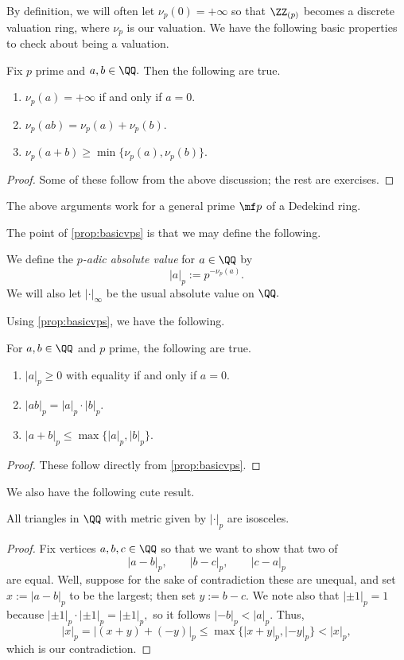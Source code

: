 \documentclass[../notes.tex]{subfiles}
\begin{document}
By definition, we will often let $\nu_p(0)=+\infty$ so that $\ZZ_{(p)}$ becomes a discrete valuation ring, where $\nu_p$ is our valuation. We have the following basic properties to check about being a valuation.
\begin{proposition} \label{prop:basicvps}
	Fix $p$ prime and $a,b\in\QQ.$ Then the following are true.
	\begin{enumerate}[label=(\alph*)]
		\item $\nu_p(a)=+\infty$ if and only if $a=0.$
		\item $\nu_p(ab)=\nu_p(a)+\nu_p(b).$
		\item $\nu_p(a+b)\ge\min\{\nu_p(a),\nu_p(b)\}.$
	\end{enumerate}
\end{proposition}
\begin{proof}
	Some of these follow from the above discussion; the rest are exercises.\todo{}
\end{proof}
\begin{remark}
	The above arguments work for a general prime $\mf p$ of a Dedekind ring.
\end{remark}
The point of \autoref{prop:basicvps} is that we may define the following.
\begin{defi}
	We define the \textit{$p$-adic absolute value} for $a\in\QQ$ by
	\[|a|_p:=p^{-\nu_p(a)}.\]
	We will also let $|\cdot|_\infty$ be the usual absolute value on $\QQ.$
\end{defi}
Using \autoref{prop:basicvps}, we have the following.
\begin{corollary}
	For $a,b\in\QQ$ and $p$ prime, the following are true.
	\begin{enumerate}[label=(\alph*)]
		\item $|a|_p\ge0$ with equality if and only if $a=0.$
		\item $|ab|_p=|a|_p\cdot|b|_p.$
		\item $|a+b|_p\le\max\{|a|_p,|b|_p\}.$
	\end{enumerate}
\end{corollary}
\begin{proof}
	These follow directly from \autoref{prop:basicvps}.
\end{proof}
We also have the following cute result.
\begin{proposition}
	All triangles in $\QQ$ with metric given by $|\cdot|_p$ are isosceles.
\end{proposition}
\begin{proof}
	Fix vertices $a,b,c\in\QQ$ so that we want to show that two of
	\[|a-b|_p,\qquad|b-c|_p,\qquad|c-a|_p\]
	are equal. Well, suppose for the sake of contradiction these are unequal, and set $x:=|a-b|_p$ to be the largest; then set $y:=b-c.$ We note also that $|\pm1|_p=1$ because $|\pm1|_p\cdot|\pm1|_p=|\pm1|_p,$ so it follows $|-b|_p<|a|_p.$ Thus,
	\[|x|_p=|(x+y)+(-y)|_p\le\max\{|x+y|_p,|-y|_p\}<|x|_p,\]
	which is our contradiction.
\end{proof}
\end{document}
